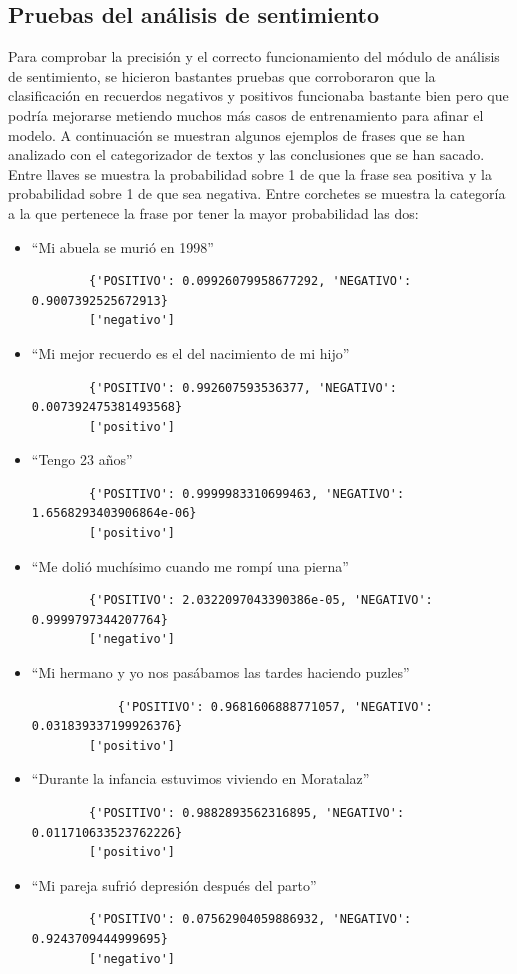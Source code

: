 \subsection{Pruebas del análisis de sentimiento}

Para comprobar la precisión y el correcto funcionamiento del módulo de análisis de sentimiento, se hicieron bastantes pruebas que corroboraron que la clasificación en recuerdos negativos y positivos funcionaba bastante bien pero que podría mejorarse metiendo muchos más casos de entrenamiento para afinar el modelo. A continuación se muestran algunos ejemplos de frases que se han analizado con el categorizador de textos y las conclusiones que se han sacado. Entre llaves se muestra la probabilidad sobre 1 de que la frase sea positiva y la probabilidad sobre 1 de que sea negativa. Entre corchetes se muestra la categoría a la que pertenece la frase por tener la mayor probabilidad las dos:

\begin{itemize}
	\item ``Mi abuela se murió en 1998''
	\begin{verbatim}
		{'POSITIVO': 0.09926079958677292, 'NEGATIVO': 0.9007392525672913}
		['negativo']
	\end{verbatim}
	\item ``Mi mejor recuerdo es el del nacimiento de mi hijo''
	\begin{verbatim}
		{'POSITIVO': 0.992607593536377, 'NEGATIVO': 0.007392475381493568}
		['positivo']
	\end{verbatim}
	\item ``Tengo 23 años''
	\begin{verbatim}
		{'POSITIVO': 0.9999983310699463, 'NEGATIVO': 1.6568293403906864e-06}
		['positivo']
	\end{verbatim}
	\item ``Me dolió muchísimo cuando me rompí una pierna''
	\begin{verbatim}
		{'POSITIVO': 2.0322097043390386e-05, 'NEGATIVO': 0.9999797344207764}
		['negativo']
	\end{verbatim}
	\item ``Mi hermano y yo nos pasábamos las tardes haciendo puzles''
	\begin{verbatim}
			{'POSITIVO': 0.9681606888771057, 'NEGATIVO': 0.031839337199926376}
		['positivo']
	\end{verbatim}
	\item ``Durante la infancia estuvimos viviendo en Moratalaz''
	\begin{verbatim}
		{'POSITIVO': 0.9882893562316895, 'NEGATIVO': 0.011710633523762226}
		['positivo']
	\end{verbatim}
	\item ``Mi pareja sufrió depresión después del parto''
	\begin{verbatim}
		{'POSITIVO': 0.07562904059886932, 'NEGATIVO': 0.9243709444999695}
		['negativo']
	\end{verbatim}

\end{itemize}

